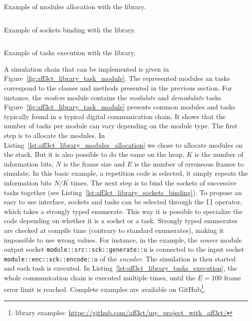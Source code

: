 \begin{listing}[htp]
  \inputminted[frame=lines,linenos]{C++}{\curChapter/src/use_cases/library/modules_allocation.cpp}
  \caption{Example of modules allocation with the \AFFECT library.}
  \label{lst:aff3ct_library_modules_allocation}
\end{listing}
\begin{listing}[htp]
  \inputminted[frame=lines,linenos]{C++}{\curChapter/src/use_cases/library/sockets_binding.cpp}
  \caption{Example of sockets binding with the \AFFECT library.}
  \label{lst:aff3ct_library_sockets_binding}
\end{listing}
\begin{listing}[htp]
  \inputminted[frame=lines,linenos]{C++}{\curChapter/src/use_cases/library/tasks_execution.cpp}
  \caption{Example of tasks execution with the \AFFECT library.}
  \label{lst:aff3ct_library_tasks_execution}
\end{listing}

A simulation chain that can be implemented is given in
Figure~\ref{fig:aff3ct_library_task_module}. The represented modules an tasks
correspond to the classes and methods presented in the previous section. For
instance, the \textit{modem} module contains the \textit{modulate} and
\textit{demodulate} tasks. Figure~\ref{fig:aff3ct_library_task_module} presents
common modules and tasks typically found in a typical digital communication
chain. It shows that the number of tasks per module can vary depending on the
module type. The first step is to allocate the modules. In
Listing~\ref{lst:aff3ct_library_modules_allocation} we chose to allocate modules
on the stack. But it is also possible to do the same on the heap. $K$ is the
number of information bits, $N$ is the frame size and $E$ is the number of
erroneous frames to simulate. In this basic example, a repetition code is
selected, it simply repeats the information bits $N/K$ times. The next step is
to bind the sockets of successive tasks together (see
Listing~\ref{lst:aff3ct_library_sockets_binding}). To propose an easy to use
interface, sockets and tasks can be selected through the \verb|[]| operator,
which takes a \Cxx strongly typed enumerate. This way it is possible to
specialize the code depending on whether it is a socket or a task. Strongly
typed enumerates are checked at compile time (contrary to standard enumerates),
making it impossible to use wrong values. For instance, in the example, the
\textit{source} module output socket \verb|module::src::sck::generate::u| is
connected to the input socket \verb|module::enc::sck::encode::u| of the
\textit{encoder}. The simulation is then started and each task is executed. In
Listing~\ref{lst:aff3ct_library_tasks_execution}, the whole communication chain
is executed multiple times, until the $E = 100$ frame error limit is reached.
Complete examples are available on
GitHub\footnote{\AFFECT library examples:
\url{https://github.com/aff3ct/my_project_with_aff3ct/}}.

